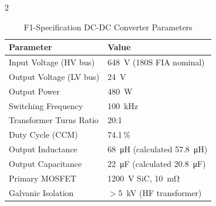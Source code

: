 \begin{multicols}{2}
\begin{table}[H]
\centering
\caption{F1-Specification DC-DC Converter Parameters}
\vspace{0.2cm}
\begin{tabularx}{\textwidth}{@{}XX@{}}
\toprule
\textbf{Parameter} & \textbf{Value} \\
\midrule
Input Voltage (HV bus)         & \SI{648}{V} (180S FIA nominal) \\
Output Voltage (LV bus)        & \SI{24}{V} \\
Output Power                   & \SI{480}{W} \\
Switching Frequency            & \SI{100}{kHz} \\
Transformer Turns Ratio        & 20:1 \\
Duty Cycle (CCM)               & 74.1\,\% \\
Output Inductance              & \SI{68}{\micro\henry} (calculated \SI{57.8}{\micro\henry}) \\
Output Capacitance             & \SI{22}{\micro\farad} (calculated \SI{20.8}{\micro\farad}) \\
Primary MOSFET                 & \SI{1200}{V} SiC, \SI{10}{\milli\ohm} \\
Galvanic Isolation             & $>$\SI{5}{kV} (HF transformer) \\
\bottomrule
\end{tabularx}
\label{tab:dcdc_f1_params}
\end{table}
\end{multicols}
